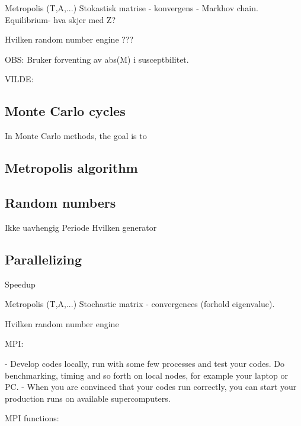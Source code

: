 
Metropolis (T,A,...)
	Stokastisk matrise  - konvergens - Markhov chain.
		Equilibrium- hva skjer med Z?
		
	Hvilken random number engine ??? 

	
	OBS: Bruker forventing av abs(M) i susceptbilitet. 



VILDE: 


\subsection{Monte Carlo cycles}

In Monte Carlo methods, the goal is to 





\subsection{Metropolis algorithm}

\subsection{Random numbers}

Ikke uavhengig
Periode
Hvilken generator


\subsection{Parallelizing}

Speedup

Metropolis (T,A,...)
Stochastic matrix  - convergences (forhold eigenvalue).

Hvilken random number engine

MPI:	

- Develop codes locally, run with some few processes and test your codes. Do benchmarking, timing and so forth on local nodes, for example your laptop or PC.
- When you are convinced that your codes run correctly, you can start your production runs on available supercomputers.


MPI functions:
%
%
%
%
%
%
%
